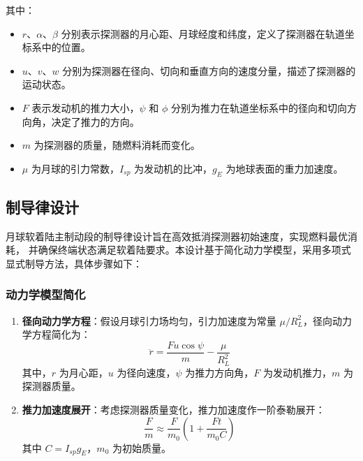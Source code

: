 \documentclass[12pt,a4paper]{article}
\begin{document}
其中：
\begin{itemize}
    \item \(r\)、\(\alpha\)、\(\beta\) 分别表示探测器的月心距、月球经度和纬度，定义了探测器在轨道坐标系中的位置。
    \item \(u\)、\(v\)、\(w\) 分别为探测器在径向、切向和垂直方向的速度分量，描述了探测器的运动状态。
    \item \(F\) 表示发动机的推力大小，\(\psi\) 和 \(\phi\) 分别为推力在轨道坐标系中的径向和切向方向角，决定了推力的方向。
    \item \(m\) 为探测器的质量，随燃料消耗而变化。
    \item \(\mu\) 为月球的引力常数，\(I_{sp}\) 为发动机的比冲，\(g_E\) 为地球表面的重力加速度。
\end{itemize}

\subsection{制导律设计}
月球软着陆主制动段的制导律设计旨在高效抵消探测器初始速度，实现燃料最优消耗，
并确保终端状态满足软着陆要求。本设计基于简化动力学模型，采用多项式显式制导方法，具体步骤如下：

\subsubsection{动力学模型简化}
\begin{enumerate}
    \item \textbf{径向动力学方程}：假设月球引力场均匀，引力加速度为常量 \(\mu/R_L^2\)，径向动力学方程简化为：
    \begin{equation}
        \ddot{r} = \frac{F u \cos \psi}{m} - \frac{\mu}{R_L^2} 
        \label{eq:radial_dynamics}
    \end{equation}
    其中，\(r\) 为月心距，\(u\) 为径向速度，\(\psi\) 为推力方向角，\(F\) 为发动机推力，\(m\) 为探测器质量。

    \item \textbf{推力加速度展开}：考虑探测器质量变化，推力加速度作一阶泰勒展开：
    \begin{equation}
        \frac{F}{m} \approx \frac{F}{m_0} \left( 1 + \frac{F t}{m_0 C} \right)
        \label{eq:thrust_expansion}
    \end{equation}
    其中 \(C = I_{sp} g_E\)，\(m_0\) 为初始质量。
\end{enumerate}
\end{document}
